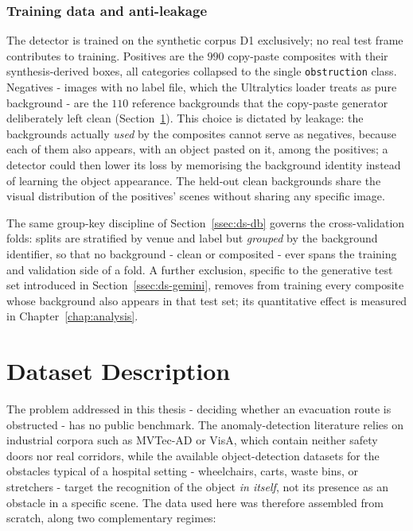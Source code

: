\subsubsection{Training data and anti-leakage}
\label{sssec:p1-data}

The detector is trained on the synthetic corpus D1 exclusively; no real test
frame contributes to training. Positives are the $990$ copy-paste composites
with their synthesis-derived boxes, all categories collapsed to the single
\texttt{obstruction} class. Negatives - images with no label file, which the
Ultralytics loader treats as pure background - are the $110$ reference
backgrounds that the copy-paste generator deliberately left clean
(Section~\ref{sec:dataset}). This choice is dictated by leakage: the
backgrounds actually \emph{used} by the composites cannot serve as negatives,
because each of them also appears, with an object pasted on it, among the
positives; a detector could then lower its loss by memorising the background
identity instead of learning the object appearance. The held-out clean
backgrounds share the visual distribution of the positives' scenes without
sharing any specific image.

The same group-key discipline of Section~\ref{ssec:ds-db} governs the
cross-validation folds: splits are stratified by venue and label but
\emph{grouped} by the background identifier, so that no background - clean or
composited - ever spans the training and validation side of a fold. A further
exclusion, specific to the generative test set introduced in
Section~\ref{ssec:ds-gemini}, removes from training every composite whose
background also appears in that test set; its quantitative effect is measured
in Chapter~\ref{chap:analysis}.

\section{Dataset Description}
\label{sec:dataset}

The problem addressed in this thesis - deciding whether an evacuation route is
obstructed - has no public benchmark. The anomaly-detection literature relies on
industrial corpora such as MVTec-AD \cite{Bergmann2019} or VisA, which contain
neither safety doors nor real corridors, while the available object-detection
datasets for the obstacles typical of a hospital setting - wheelchairs, carts,
waste bins, or stretchers - target the recognition of the object \emph{in
itself}, not its presence as an obstacle in a specific scene. The
data used here was therefore assembled from scratch, along two complementary
regimes:

